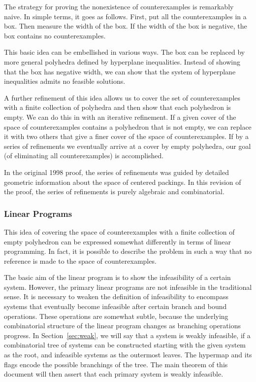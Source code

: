 The strategy for proving the nonexistence of counterexamples is
remarkably naive. In simple terms, it goes as follows.  First, put
all the counterexamples in a box. Then measure the width of the
box. If the width of the box is negative, the box contains no
counterexamples.

This basic idea can be embellished in various ways.  The box can
be replaced by more general polyhedra defined by hyperplane
inequalities.  Instead of showing that the box has negative width,
we can show that the system of hyperplane inequalities admits no
feasible solutions.

A further refinement of this idea allows us to cover the set of
counterexamples with a finite collection of polyhedra and then
show that each polyhedron is empty.  We can do this in with an
iterative refinement.  If a given cover of the space of
counterexamples contains a polyhedron that is not empty, we can
replace it with two others that give a finer cover of the space of
counterexamples.  If by a series of  refinements we eventually
arrive at a cover by empty polyhedra, our goal (of eliminating all
counterexamples) is accomplished.

In the original 1998 proof, the series of refinements was guided
by detailed geometric information about the space of centered
packings.  In this revision of the proof, the series of
refinements is purely algebraic and combinatorial.

\subsubsection{Linear Programs}

This idea of covering the space of counterexamples with a finite
collection of empty polyhedron can be expressed somewhat
differently in terms of linear programming.  In fact, it is
possible to describe the problem in such a way that no reference
is made to the space of counterexamples.

The basic aim of the linear program is to show the infeasibility
of a certain system.  However, the primary linear programs are not
infeasible in the traditional sense.  It is necessary to weaken
the definition of infeasibility to encompass systems that
eventually become infeasible after certain branch and bound
operations.  These operations are somewhat subtle, because the
underlying combinatorial structure of the linear program changes
as branching operations progress.   In Section~\ref{sec:weak}, we
will say that a system is weakly infeasible, if a combinatorial
tree of systems can be constructed starting with the given system
as the root, and infeasible systems as the outermost leaves.  The
hypermap and its flags encode the possible branchings of the tree.
The main theorem of this document will then assert that each
primary system is weakly infeasible.

